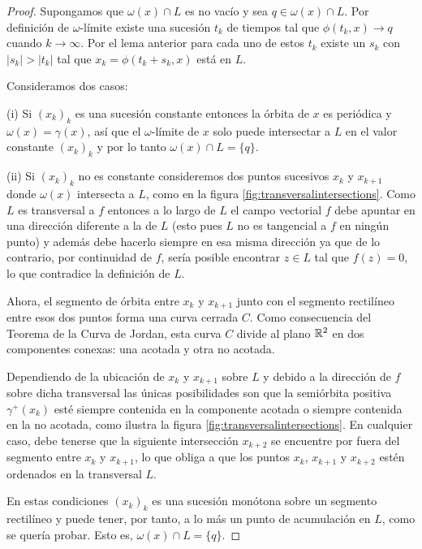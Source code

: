 \begin{proof}
Supongamos que $\omega(x) \cap L$ es no vacío y sea $q \in \omega(x) \cap L$. Por definición de $\omega$-límite existe una sucesión $t_k$ de tiempos tal que $\phi(t_k, x) \to q$ cuando $k \to \infty$. Por el lema anterior para cada uno de estos $t_k$ existe un $s_k$ con $|s_k| > |t_k|$ tal que $x_k = \phi(t_k + s_k, x)$ está en $L$.

Consideramos dos casos:

(i) Si $(x_k)_k$ es una sucesión constante entonces la órbita de $x$ es periódica y $\omega(x) = \gamma(x)$, así que el $\omega$-límite de $x$ solo puede intersectar a $L$ en el valor constante $(x_k)_k$ y por lo tanto $\omega(x) \cap L = \{q\}$.

(ii) Si $(x_k)_k$ no es constante consideremos dos puntos sucesivos $x_k$ y $x_{k+1}$ donde $\omega(x)$ intersecta a $L$, como en la figura \ref{fig:transversalintersections}. Como $L$ es transversal a $f$ entonces a lo largo de $L$ el campo vectorial $f$ debe apuntar en una dirección diferente a la de $L$ (esto pues $L$ no es tangencial a $f$ en ningún punto) y además debe hacerlo siempre en esa misma dirección ya que de lo contrario, por continuidad de $f$, sería posible encontrar $z \in L$ tal que $f(z) = 0$, lo que contradice la definición de $L$.

Ahora, el segmento de órbita entre $x_k$ y $x_{k+1}$ junto con el segmento rectilíneo entre esos dos puntos forma una curva cerrada $C$. Como consecuencia del Teorema de la Curva de Jordan, esta curva $C$ divide al plano ${\mathbb{R}}^2$ en dos componentes conexas: una acotada y otra no acotada.

Dependiendo de la ubicación de $x_k$ y $x_{k+1}$ sobre $L$ y debido a la dirección de $f$ sobre dicha transversal las únicas posibilidades son que la semiórbita positiva $\gamma^+(x_k)$ esté siempre contenida en la componente acotada o siempre contenida en la no acotada, como ilustra la figura \ref{fig:transversalintersections}. En cualquier caso, debe tenerse que la siguiente intersección $x_{k+2}$ se encuentre por fuera del segmento entre $x_k$ y $x_{k+1}$, lo que obliga a que los puntos $x_k$, $x_{k+1}$ y $x_{k+2}$ estén ordenados en la transversal $L$.

En estas condiciones $(x_k)_k$ es una sucesión monótona sobre un segmento rectilíneo y puede tener, por tanto, a lo más un punto de acumulación en $L$, como se quería probar. Esto es, $\omega(x) \cap L = \{q\}$.

\end{proof}

